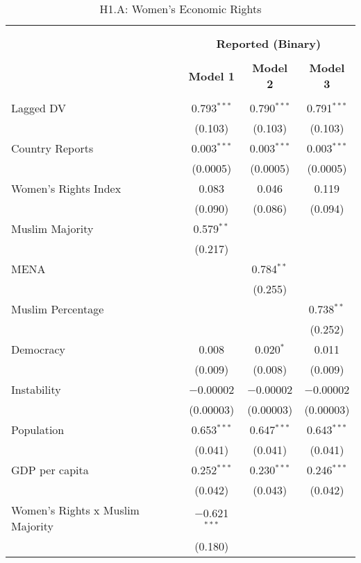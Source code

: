 
\begin{table}[!htbp] \centering 
  \caption{H1.A: Women's Economic Rights} 
  \label{} 
\begin{tabular}{@{\extracolsep{5pt}}lccc} 
\\[-1.8ex]\hline \\[-1.8ex] 
\\[-1.8ex] & \multicolumn{3}{c}{\textbf{Reported (Binary)}} \\ 
\\[-1.8ex] & \textbf{Model 1} & \textbf{Model 2} & \textbf{Model 3}\\ 
\hline \\[-1.8ex] 
 Lagged DV & 0.793$^{***}$ & 0.790$^{***}$ & 0.791$^{***}$ \\ 
  & (0.103) & (0.103) & (0.103) \\ 
  Country Reports & 0.003$^{***}$ & 0.003$^{***}$ & 0.003$^{***}$ \\ 
  & (0.0005) & (0.0005) & (0.0005) \\ 
  Women's Rights Index & 0.083 & 0.046 & 0.119 \\ 
  & (0.090) & (0.086) & (0.094) \\ 
  Muslim Majority & 0.579$^{**}$ &  &  \\ 
  & (0.217) &  &  \\ 
  MENA &  & 0.784$^{**}$ &  \\ 
  &  & (0.255) &  \\ 
  Muslim Percentage &  &  & 0.738$^{**}$ \\ 
  &  &  & (0.252) \\ 
  Democracy & 0.008 & 0.020$^{*}$ & 0.011 \\ 
  & (0.009) & (0.008) & (0.009) \\ 
  Instability & $-$0.00002 & $-$0.00002 & $-$0.00002 \\ 
  & (0.00003) & (0.00003) & (0.00003) \\ 
  Population & 0.653$^{***}$ & 0.647$^{***}$ & 0.643$^{***}$ \\ 
  & (0.041) & (0.041) & (0.041) \\ 
  GDP per capita & 0.252$^{***}$ & 0.230$^{***}$ & 0.246$^{***}$ \\ 
  & (0.042) & (0.043) & (0.042) \\ 
  Women's Rights x Muslim Majority & $-$0.621$^{***}$ &  &  \\ 
  & (0.180) &  &  \\ 

\end{tabular}
\end{table}

